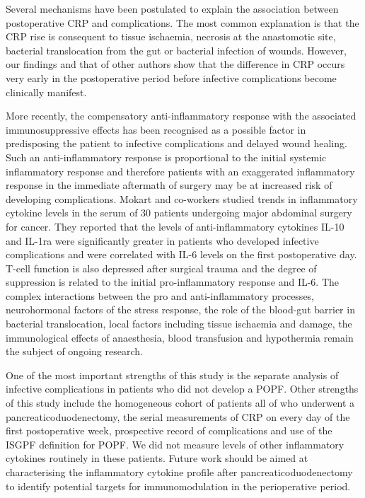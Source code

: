 Several mechanisms have been postulated to explain the association between postoperative CRP and complications. The most common explanation is that the CRP rise is consequent to tissue ischaemia, necrosis at the anastomotic site, bacterial translocation from the gut or bacterial infection of wounds. However, our findings and that of other authors show that the difference in CRP occurs very early in the postoperative period before infective complications become clinically manifest. 

More recently, the compensatory anti-inflammatory response with the associated immunosuppressive effects has been recognised as a possible factor in predisposing the patient to infective complications and delayed wound healing. Such an anti-inflammatory response is proportional to the initial systemic inflammatory response and therefore patients with an exaggerated inflammatory response in the immediate aftermath of surgery may be at increased risk of developing complications. Mokart and co-workers studied trends in inflammatory cytokine levels in the serum of 30 patients undergoing major abdominal surgery for cancer. They reported that the levels of anti-inflammatory cytokines IL-10 and IL-1ra were significantly greater in patients who developed infective complications and were correlated with IL-6 levels on the first postoperative day. T-cell function is also depressed after surgical trauma and the degree of suppression is related to the initial pro-inflammatory response and IL-6.\parencite{faist_immunosuppression_1997} The complex interactions between the pro and anti-inflammatory processes, neurohormonal factors of the stress response, the role of the blood-gut barrier in bacterial translocation, local factors including tissue ischaemia and damage, the immunological effects of anaesthesia, blood transfusion and hypothermia remain the subject of ongoing research.\parencite{buttenschoen_effect_2010}

One of the most important strengths of this study is the separate analysis of infective complications in patients who did not develop a POPF. Other strengths of this study include the homogeneous cohort of patients all of who underwent a pancreaticoduodenectomy, the serial measurements of CRP on every day of the first postoperative week, prospective record of complications and use of the ISGPF definition for POPF. We did not measure levels of other inflammatory cytokines routinely in these patients. Future work should be aimed at characterising the inflammatory cytokine profile after pancreaticoduodenectomy to identify potential targets for immunomodulation in the perioperative period. 

